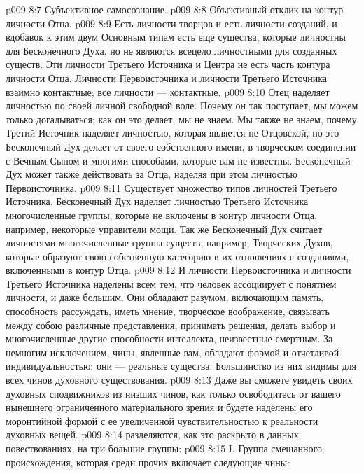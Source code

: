 \vs p009 8:7 \bibnobreakspace Субъективное самосознание.
\vs p009 8:8 \bibnobreakspace Объективный отклик на контур личности Отца.
\vs p009 8:9 \pc Есть личности творцов и есть личности созданий, и вдобавок к этим двум Основным типам есть еще  существа, которые личностны для Бесконечного Духа, но не являются всецело личностными для созданных существ. Эти личности Третьего Источника и Центра не есть часть контура личности Отца. Личности Первоисточника и личности Третьего Источника взаимно контактные; все личности --- контактные.
\vs p009 8:10 \pc Отец наделяет личностью по своей личной свободной воле. Почему он так поступает, мы можем только догадываться; как он это делает, мы не знаем. Мы также не знаем, почему Третий Источник наделяет личностью, которая является не\hyp{}Отцовской, но это Бесконечный Дух делает от своего собственного имени, в творческом соединении с Вечным Сыном и многими способами, которые вам не известны. Бесконечный Дух может также действовать за Отца, наделяя при этом личностью Первоисточника.
\vs p009 8:11 \pc Существует множество типов личностей Третьего Источника. Бесконечный Дух наделяет личностью Третьего Источника многочисленные группы, которые не включены в контур личности Отца, например, некоторые управители мощи. Так же Бесконечный Дух считает личностями многочисленные группы существ, например, Творческих Духов, которые образуют свою собственную категорию в их отношениях с созданиями, включенными в контур Отца.
\vs p009 8:12 И личности Первоисточника и личности Третьего Источника наделены всем тем, что человек ассоциирует с понятием личности, и даже большим. Они обладают разумом, включающим память, способность рассуждать, иметь мнение, творческое воображение, связывать между собою различные представления, принимать решения, делать выбор и многочисленные другие способности интеллекта, неизвестные смертным. За немногим исключением, чины, явленные вам, обладают формой и отчетливой индивидуальностью; они --- реальные существа. Большинство из них видимы для всех чинов духовного существования.
\vs p009 8:13 Даже вы сможете увидеть своих духовных сподвижников из низших чинов, как только освободитесь от вашего нынешнего ограниченного материального зрения и будете наделены его моронтийной формой с ее увеличенной чувствительностью к реальности духовных вещей.
\vs p009 8:14 \pc {} разделяются, как это раскрыто в данных повествованиях, на три большие группы:
\vs p009 8:15 \pc I.  Группа смешанного происхождения, которая среди прочих включает следующие чины:
